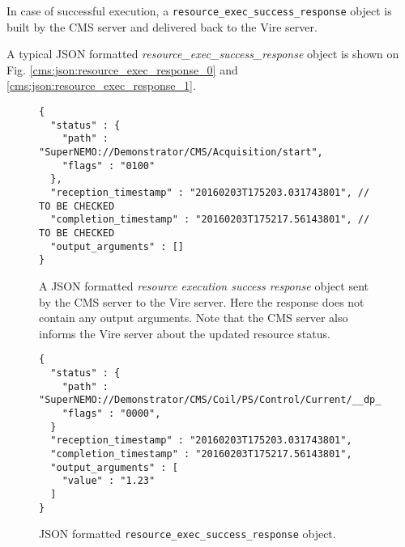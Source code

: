 In case of successful execution, a
 \texttt{resource\_exec\_success\_response} object is built by the CMS server and
delivered back to the
Vire server.




A  typical JSON  formatted \emph{resource\_exec\_success\_response} object is
shown    on    Fig.     \ref{cms:json:resource_exec_response_0}    and
\ref{cms:json:resource_exec_response_1}.

  \begin{figure}[h]
  \footnotesize
  \begin{Verbatim}[frame=single,xleftmargin=0.cm,label=\fbox{\texttt{JSON}}]
{
  "status" : {
    "path" : "SuperNEMO://Demonstrator/CMS/Acquisition/start",
    "flags" : "0100"
  },
  "reception_timestamp" : "20160203T175203.031743801", // TO BE CHECKED
  "completion_timestamp" : "20160203T175217.56143801", // TO BE CHECKED
  "output_arguments" : []
}
\end{Verbatim}
  \normalsize
  \caption{A  JSON formatted \emph{resource  execution success  response}
    object sent  by the  CMS server  to the  Vire server. Here
    the response does not contain  any output arguments. Note that the
    CMS  server  also informs  the  Vire  server about  the updated
    resource status.
  }
  \label{cms:json:resource_exec_success_response_0}
  \end{figure}

  \begin{figure}[h]
  \footnotesize
  \begin{Verbatim}[frame=single,xleftmargin=0.cm,label=\fbox{\texttt{JSON}}]
{
  "status" : {
    "path" : "SuperNEMO://Demonstrator/CMS/Coil/PS/Control/Current/__dp_read__",
    "flags" : "0000",
  }
  "reception_timestamp" : "20160203T175203.031743801",
  "completion_timestamp" : "20160203T175217.56143801",
  "output_arguments" : [
    "value" : "1.23"
  ]
}
\end{Verbatim}
  \normalsize
  \caption{JSON formatted \texttt{resource\_exec\_success\_response} object.}
  \label{cms:json:resource_exec_success_response_1}
  \end{figure}

